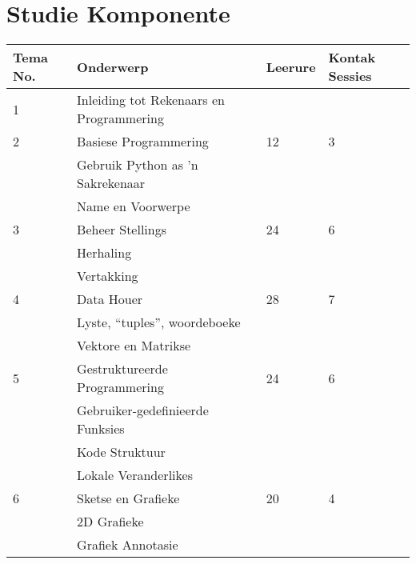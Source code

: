\section{Studie Komponente}
        \begin{table}[!h]
             \begin{tabular}{|p{1.4cm}|l|p{2cm}|p{2cm}|}
                 \hline
                 {\bf Tema No.} & {\bf Onderwerp} & 
                    {\bf Leerure} & {\bf Kontak Sessies} \\
                 \hline
                 1  & Inleiding tot Rekenaars en Programmering &    &   \\
                 \hline
                 2  & Basiese Programmering                     & 12 & 3 \\
                    & \qquad Gebruik Python as 'n Sakrekenaar   &    &   \\
                    & \qquad Name en Voorwerpe                  &    &   \\
                 \hline
                 3  & Beheer Stellings                          & 24 & 6 \\
                    & \qquad Herhaling                          &    &   \\
                    & \qquad Vertakking                         &    &   \\                 
                 \hline
                 4  & Data Houer                             & 28 & 7 \\
                    & \qquad Lyste, ``tuples'', woordeboeke     &    &   \\
                    & \qquad Vektore en Matrikse                &    &   \\                 
                 \hline
                 5  & Gestruktureerde Programmering              & 24 & 6 \\
                    & \qquad Gebruiker-gedefinieerde Funksies   &    &   \\                 
                    & \qquad Kode Struktuur                     &    &   \\
                    & \qquad Lokale Veranderlikes               &    &   \\
                 \hline
                 6  & Sketse en Grafieke                        & 20 & 4 \\
                    & \qquad 2D Grafieke                        &    &   \\
                    & \qquad Grafiek Annotasie                  &    &   \\

\end{tabular}
\end{table}
